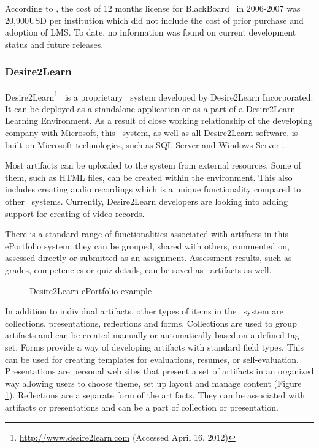 According to \citet{Sweat-Guy2007}, the cost of 12 months license for
BlackBoard \ep~in 2006-2007 was 20,900USD per institution which did not include
the cost of prior purchase and adoption of LMS. To date, no information was
found on current development status and future releases.

\subsubsection{Desire2Learn}
Desire2Learn\footnote{\url{http://www.desire2learn.com} (Accessed April 16,
2012)} \ep~is a proprietary \ep~system developed by Desire2Learn Incorporated. It can be deployed as a
standalone application or as a part of a Desire2Learn Learning Environment. As a
result of close working relationship of the developing company with Microsoft,
this \ep~system, as well as all Desire2Learn software, is built on Microsoft
technologies, such as SQL Server and Windows Server \citep{AAEEBL2011a}.

Most artifacts can be uploaded to the system from external resources. Some of
them, such as HTML files, can be created within the environment. This also
includes creating audio recordings which is a unique functionality compared to
other \ep~systems. Currently, Desire2Learn developers are looking into adding
support for creating of video records.

There is a standard range of functionalities associated with artifacts in this
ePortfolio system: they can be grouped, shared with others, commented on,
assessed directly or submitted as an assignment. Assessment results, such as
grades, competencies or quiz details, can be saved as \ep~artifacts as well.

\begin{figure}[htb]
\centering
\setlength\fboxsep{0pt}
\setlength\fboxrule{0.5pt}
\fbox{\texttt{[image: CH4-F7-D2L]}}
\caption[Desire2Learn ePortfolio example]{Desire2Learn ePortfolio example
\citep{Desire2LearnIncorporated2011}}
\label{fig:d2ep} 
\end{figure}

In addition to individual artifacts, other types of items in the \ep~system are
collections, presentations, reflections and forms. Collections are used to group
artifacts and can be created manually or automatically based on a defined tag
set. Forms provide a way of developing artifacts with standard field types. This
can be used for creating templates for evaluations, resumes, or self-evaluation.
Presentations are personal web sites that present a set of artifacts in an
organized way allowing users to choose theme, set up layout and manage content
(Figure \ref{fig:d2ep}). Reflections are a separate form of the artifacts. They
can be associated with artifacts or presentations and can be a part of
collection or presentation.

